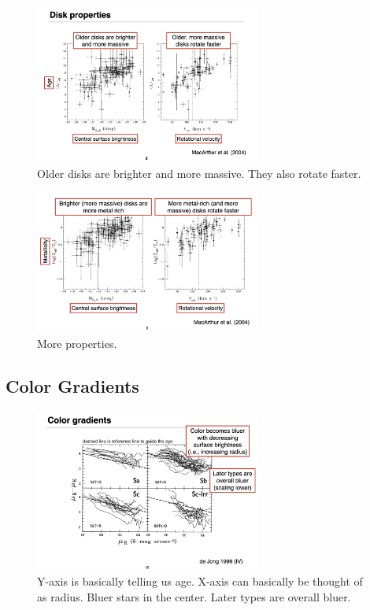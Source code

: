 \documentclass{article}
\begin{document}
\begin{figure}
    \centering
    \includegraphics[width=0.66\textwidth]{figs/Screen Shot 2021-10-22 at 9.53.14 AM.png}
    \caption{Older disks are brighter and more massive. They also rotate faster. }
    \label{fig:disk_properties}
\end{figure}

\begin{figure}
    \centering
    \includegraphics[width=0.66\textwidth]{figs/Screen Shot 2021-10-22 at 9.54.20 AM.png}
    \caption{More properties.}
    \label{fig:props}
\end{figure}

\subsection{Color Gradients}

\begin{figure}
    \centering
    \includegraphics[width=0.66\textwidth]{figs/Screen Shot 2021-10-22 at 9.55.24 AM.png}
    \caption{Y-axis is basically telling us age. X-axis can basically be thought of as radius. Bluer stars in the center. Later types are overall bluer. }
    \label{fig:boo}
\end{figure}
\end{document}
